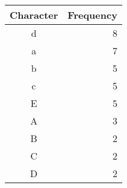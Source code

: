 \documentclass{cal}
\begin{document}
{\begin{center} \begin{tabular}{c | r}
    \textbf{Character} & \textbf{Frequency} \\ \hline
    d                  &                  8 \\
    a                  &                  7 \\
    b                  &                  5 \\
    c                  &                  5 \\
    E                  &                  5 \\
    A                  &                  3 \\
    B                  &                  2 \\
    C                  &                  2 \\
    D                  &                  2 \\
\end{tabular} \end{center}

}
\end{document}
